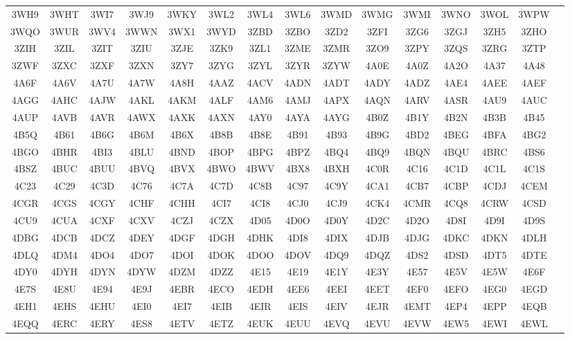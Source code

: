 \begin{longtable}{ c c c c c c c c c c c c c c c }
	3WH9 & 3WHT & 3WI7 & 3WJ9 & 3WKY & 3WL2 & 3WL4 & 3WL6 & 3WMD & 3WMG & 3WMI & 3WNO & 3WOL & 3WPW  \\
	3WQO & 3WUR & 3WV4 & 3WWN & 3WX1 & 3WYD & 3ZBD & 3ZBO & 3ZD2 & 3ZFI & 3ZG6 & 3ZGJ & 3ZH5 & 3ZHO  \\
	3ZIH & 3ZIL & 3ZIT & 3ZIU & 3ZJE & 3ZK9 & 3ZL1 & 3ZME & 3ZMR & 3ZO9 & 3ZPY & 3ZQS & 3ZRG & 3ZTP  \\
	3ZWF & 3ZXC & 3ZXF & 3ZXN & 3ZY7 & 3ZYG & 3ZYL & 3ZYR & 3ZYW & 4A0E & 4A0Z & 4A2O & 4A37 & 4A48  \\
	4A6F & 4A6V & 4A7U & 4A7W & 4A8H & 4AAZ & 4ACV & 4ADN & 4ADT & 4ADY & 4ADZ & 4AE4 & 4AEE & 4AEF  \\
	4AGG & 4AHC & 4AJW & 4AKL & 4AKM & 4ALF & 4AM6 & 4AMJ & 4APX & 4AQN & 4ARV & 4ASR & 4AU9 & 4AUC  \\
	4AUP & 4AVB & 4AVR & 4AWX & 4AXK & 4AXN & 4AY0 & 4AYA & 4AYG & 4B0Z & 4B1Y & 4B2N & 4B3B & 4B45  \\
	4B5Q & 4B61 & 4B6G & 4B6M & 4B6X & 4B8B & 4B8E & 4B91 & 4B93 & 4B9G & 4BD2 & 4BEG & 4BFA & 4BG2  \\
	4BGO & 4BHR & 4BI3 & 4BLU & 4BND & 4BOP & 4BPG & 4BPZ & 4BQ4 & 4BQ9 & 4BQN & 4BQU & 4BRC & 4BS6  \\
	4BSZ & 4BUC & 4BUU & 4BVQ & 4BVX & 4BWO & 4BWV & 4BX8 & 4BXH & 4C0R & 4C16 & 4C1D & 4C1L & 4C1S  \\
	4C23 & 4C29 & 4C3D & 4C76 & 4C7A & 4C7D & 4C8B & 4C97 & 4C9Y & 4CA1 & 4CB7 & 4CBP & 4CDJ & 4CEM  \\
	4CGR & 4CGS & 4CGY & 4CHF & 4CHH & 4CI7 & 4CI8 & 4CJ0 & 4CJ9 & 4CK4 & 4CMR & 4CQ8 & 4CRW & 4CSD  \\
	4CU9 & 4CUA & 4CXF & 4CXV & 4CZJ & 4CZX & 4D05 & 4D0O & 4D0Y & 4D2C & 4D2O & 4D8I & 4D9I & 4D9S  \\
	4DBG & 4DCB & 4DCZ & 4DEY & 4DGF & 4DGH & 4DHK & 4DI8 & 4DIX & 4DJB & 4DJG & 4DKC & 4DKN & 4DLH  \\
	4DLQ & 4DM4 & 4DO4 & 4DO7 & 4DOI & 4DOK & 4DOO & 4DOV & 4DQ9 & 4DQZ & 4DS2 & 4DSD & 4DT5 & 4DTE  \\
	4DY0 & 4DYH & 4DYN & 4DYW & 4DZM & 4DZZ & 4E15 & 4E19 & 4E1Y & 4E3Y & 4E57 & 4E5V & 4E5W & 4E6F  \\
	4E7S & 4E8U & 4E94 & 4E9J & 4EBR & 4ECO & 4EDH & 4EE6 & 4EEI & 4EET & 4EF0 & 4EFO & 4EG0 & 4EGD  \\
	4EH1 & 4EHS & 4EHU & 4EI0 & 4EI7 & 4EIB & 4EIR & 4EIS & 4EIV & 4EJR & 4EMT & 4EP4 & 4EPP & 4EQB  \\
	4EQQ & 4ERC & 4ERY & 4ES8 & 4ETV & 4ETZ & 4EUK & 4EUU & 4EVQ & 4EVU & 4EVW & 4EW5 & 4EWI & 4EWL  \\

\end{longtable}
